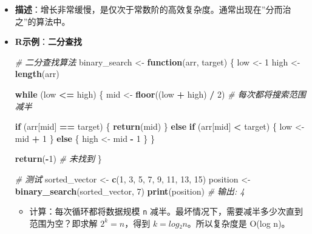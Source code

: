 \documentclass[
  twoside]{book}
\newenvironment{Shaded}{\begin{snugshade}}{\end{snugshade}}
\newcommand{\CommentTok}[1]{\textcolor[rgb]{0.56,0.35,0.01}{\textit{#1}}}
\newcommand{\ControlFlowTok}[1]{\textcolor[rgb]{0.13,0.29,0.53}{\textbf{#1}}}
\newcommand{\DecValTok}[1]{\textcolor[rgb]{0.00,0.00,0.81}{#1}}
\newcommand{\FunctionTok}[1]{\textcolor[rgb]{0.13,0.29,0.53}{\textbf{#1}}}
\newcommand{\NormalTok}[1]{#1}
\newcommand{\OtherTok}[1]{\textcolor[rgb]{0.56,0.35,0.01}{#1}}
\newcommand{\SpecialCharTok}[1]{\textcolor[rgb]{0.81,0.36,0.00}{\textbf{#1}}}
\providecommand{\tightlist}{%
  \setlength{\itemsep}{0pt}\setlength{\parskip}{0pt}}
\begin{document}
\begin{itemize}
\item
  \textbf{描述}：增长非常缓慢，是仅次于常数阶的高效复杂度。通常出现在''分而治之''的算法中。
\item
  \textbf{R示例}：\textbf{二分查找}

\begin{Shaded}
\begin{Highlighting}[]
\CommentTok{\# 二分查找算法}
\NormalTok{binary\_search }\OtherTok{\textless{}{-}} \ControlFlowTok{function}\NormalTok{(arr, target) \{}
\NormalTok{  low }\OtherTok{\textless{}{-}} \DecValTok{1}
\NormalTok{  high }\OtherTok{\textless{}{-}} \FunctionTok{length}\NormalTok{(arr)}

  \ControlFlowTok{while}\NormalTok{ (low }\SpecialCharTok{\textless{}=}\NormalTok{ high) \{}
\NormalTok{    mid }\OtherTok{\textless{}{-}} \FunctionTok{floor}\NormalTok{((low }\SpecialCharTok{+}\NormalTok{ high) }\SpecialCharTok{/} \DecValTok{2}\NormalTok{)  }\CommentTok{\# 每次都将搜索范围减半}

    \ControlFlowTok{if}\NormalTok{ (arr[mid] }\SpecialCharTok{==}\NormalTok{ target) \{}
      \FunctionTok{return}\NormalTok{(mid)}
\NormalTok{    \} }\ControlFlowTok{else} \ControlFlowTok{if}\NormalTok{ (arr[mid] }\SpecialCharTok{\textless{}}\NormalTok{ target) \{}
\NormalTok{      low }\OtherTok{\textless{}{-}}\NormalTok{ mid }\SpecialCharTok{+} \DecValTok{1}
\NormalTok{    \} }\ControlFlowTok{else}\NormalTok{ \{}
\NormalTok{      high }\OtherTok{\textless{}{-}}\NormalTok{ mid }\SpecialCharTok{{-}} \DecValTok{1}
\NormalTok{    \}}
\NormalTok{  \}}

  \FunctionTok{return}\NormalTok{(}\SpecialCharTok{{-}}\DecValTok{1}\NormalTok{)  }\CommentTok{\# 未找到}
\NormalTok{\}}

\CommentTok{\# 测试}
\NormalTok{sorted\_vector }\OtherTok{\textless{}{-}} \FunctionTok{c}\NormalTok{(}\DecValTok{1}\NormalTok{, }\DecValTok{3}\NormalTok{, }\DecValTok{5}\NormalTok{, }\DecValTok{7}\NormalTok{, }\DecValTok{9}\NormalTok{, }\DecValTok{11}\NormalTok{, }\DecValTok{13}\NormalTok{, }\DecValTok{15}\NormalTok{)}
\NormalTok{position }\OtherTok{\textless{}{-}} \FunctionTok{binary\_search}\NormalTok{(sorted\_vector, }\DecValTok{7}\NormalTok{)}
\FunctionTok{print}\NormalTok{(position)  }\CommentTok{\# 输出: 4}
\end{Highlighting}
\end{Shaded}

  \begin{itemize}
  \tightlist
  \item
    计算：每次循环都将数据规模 \texttt{n} 减半。最坏情况下，需要减半多少次直到范围为空？即求解 \(2^k = n\)，得到 \(k = log₂n\)。所以复杂度是 O(log n)。
  \end{itemize}
\end{itemize}
\end{document}
